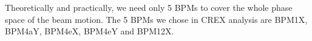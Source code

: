 \begin{comment}
For multiple detectors, it is easy to get:
\begin{equation}
    \small
    \begin{aligned}
	\begin{pmatrix}
	    \beta_{11}	& \beta_{21}    & \cdots & \beta_{m1}	\\
	    \beta_{12}	& \beta_{22}    & \cdots & \beta_{m2}	\\
	    \vdots	& \vdots    & \ddots	& \vdots\\
	    \beta_{1n}	& \beta_{2n}    & \cdots & \beta_{mn}	\\
	\end{pmatrix}
	&= A^{-1}
	&\times
	\begin{pmatrix}
	    \text{cov}(\Delta D^1, \Delta M^1) & \text{cov}(\Delta D^2, \Delta M^1)   & \cdots	& \text{cov}(\Delta D^m, \Delta M^1)	\\
	    \text{cov}(\Delta D^1, \Delta M^2) & \text{cov}(\Delta D^2, \Delta M^2)   & \cdots	& \text{cov}(\Delta D^m, \Delta M^2)	\\
	    \vdots	& \vdots    & \ddots	& \vdots    \\
	    \text{cov}(\Delta D^1, \Delta M^n) & \text{cov}(\Delta D^2, \Delta M^n)   & \cdots	& \text{cov}(\Delta D^m, \Delta M^n)	\\
	\end{pmatrix}
    \end{aligned}
    \label{eq:slope}
\end{equation}
where $\beta_{ij}$ refers to detector i's response to change in monitor j.
\end{comment}

Theoretically and practically, we need only 5 BPMs to cover the whole phase space of 
the beam motion.
The 5 BPMs we chose in CREX analysis are BPM1X, BPM4aY, BPM4eX, BPM4eY and BPM12X.


